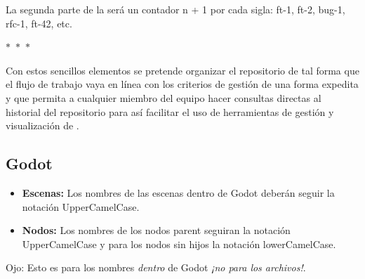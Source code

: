 La segunda parte de la  será un contador {n + 1} por cada sigla: ft-1, ft-2, bug-1, rfc-1, ft-42, etc.

 \begin{center}$\ast$~$\ast$~$\ast$\end{center}

Con estos sencillos elementos se pretende organizar el repositorio de tal forma que el flujo de trabajo vaya en línea con los criterios de gestión de una forma expedita y que permita a cualquier miembro del equipo hacer consultas directas al historial del repositorio para así facilitar el uso de herramientas de gestión y visualización de .


\subsection{Godot}\label{organizacion:godot}

\begin{itemize}
\item \textbf{Escenas:} Los nombres de las escenas dentro de Godot deberán seguir la notación UpperCamelCase.

\item \textbf{Nodos:} Los nombres de los nodos parent seguiran la notación UpperCamelCase y para los nodos sin hijos la notación lowerCamelCase.
\end{itemize}

\begin{center}
Ojo: Esto es para los nombres \emph{dentro} de Godot \emph{¡no para los archivos!}.
\end{center}